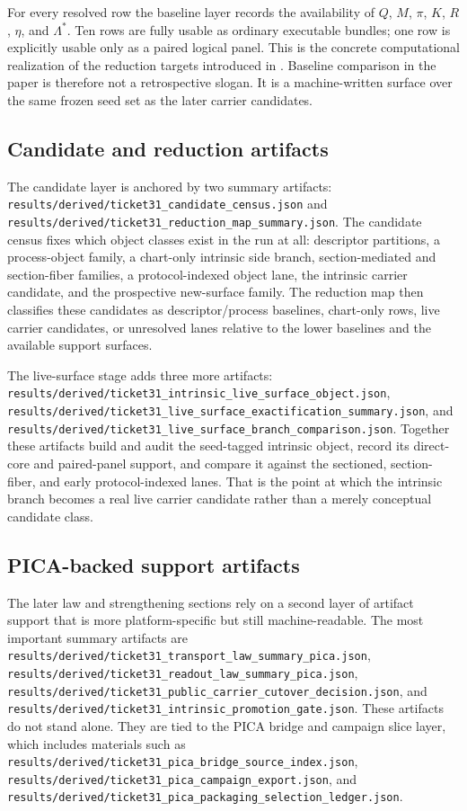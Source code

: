 \documentclass[11pt]{article}
\theoremstyle{definition}
\begin{document}
For every resolved row the baseline layer records the availability of \(Q\), \(M\),
\(\pi\), \(K\), \(R\), \(\eta\), and \(\Lambda^\ast\). Ten rows are fully usable as
ordinary executable bundles; one row is explicitly usable only as a paired logical panel.
This is the concrete computational realization of the reduction targets introduced in
. Baseline comparison in the paper is
therefore not a retrospective slogan. It is a machine-written surface over the same frozen
seed set as the later carrier candidates.

\subsection{Candidate and reduction artifacts}

The candidate layer is anchored by two summary artifacts:
\nolinkurl{results/derived/ticket31_candidate_census.json} and
\nolinkurl{results/derived/ticket31_reduction_map_summary.json}. The candidate census fixes
which object classes exist in the run at all: descriptor partitions, a process-object
family, a chart-only intrinsic side branch, section-mediated and section-fiber families, a
protocol-indexed object lane, the intrinsic carrier candidate, and the prospective
new-surface family. The reduction map then classifies these candidates as
descriptor/process baselines, chart-only rows, live carrier candidates, or unresolved
lanes relative to the lower baselines and the available support surfaces.

The live-surface stage adds three more artifacts:
\nolinkurl{results/derived/ticket31_intrinsic_live_surface_object.json},
\nolinkurl{results/derived/ticket31_live_surface_exactification_summary.json}, and
\nolinkurl{results/derived/ticket31_live_surface_branch_comparison.json}. Together these
artifacts build and audit the seed-tagged intrinsic object, record its direct-core and
paired-panel support, and compare it against the sectioned, section-fiber, and early
protocol-indexed lanes. That is the point at which the intrinsic branch becomes a real live
carrier candidate rather than a merely conceptual candidate class.

\subsection{PICA-backed support artifacts}

The later law and strengthening sections rely on a second layer of artifact support that is
more platform-specific but still machine-readable. The most important summary artifacts are
\nolinkurl{results/derived/ticket31_transport_law_summary_pica.json},
\nolinkurl{results/derived/ticket31_readout_law_summary_pica.json},
\nolinkurl{results/derived/ticket31_public_carrier_cutover_decision.json}, and
\nolinkurl{results/derived/ticket31_intrinsic_promotion_gate.json}. These artifacts do not
stand alone. They are tied to the PICA bridge and campaign slice layer, which includes
materials such as
\nolinkurl{results/derived/ticket31_pica_bridge_source_index.json},
\nolinkurl{results/derived/ticket31_pica_campaign_export.json}, and
\nolinkurl{results/derived/ticket31_pica_packaging_selection_ledger.json}.
\end{document}
